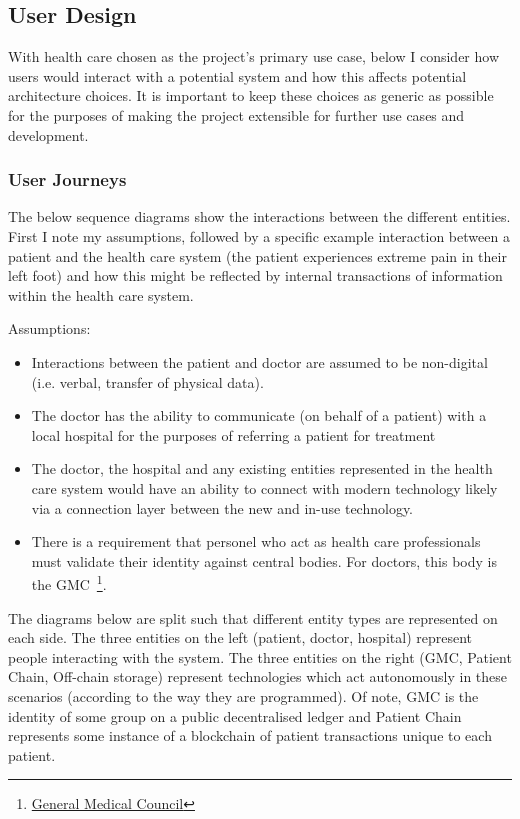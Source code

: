 \subsection{User Design}

With health care chosen as the project's primary use case, below I consider how users would interact with a potential system and how this affects potential architecture choices. It is important to keep these choices as generic as possible for the purposes of making the project extensible for further use cases and development.

\subsubsection{User Journeys}

The below sequence diagrams show the interactions between the different entities. First I note my assumptions, followed by a specific example interaction between a patient and the health care system (the patient experiences extreme pain in their left foot) and how this might be reflected by internal transactions of information within the health care system.

Assumptions:

\begin{itemize}
  \item Interactions between the patient and doctor are assumed to be non-digital (i.e. verbal, transfer of physical data).
  \item The doctor has the ability to communicate (on behalf of a patient) with a local hospital for the purposes of referring a patient for treatment
  \item The doctor, the hospital and any existing entities represented in the health care system would have an ability to connect with modern technology likely via a connection layer between the new and in-use technology.
  \item There is a requirement that personel who act as health care professionals must validate their identity against central bodies. For doctors, this body is the GMC~\footnote{\href{http://www.gmc-uk.org/}{General Medical Council}}.
\end{itemize}

The diagrams below are split such that different entity types are represented on each side. The three entities on the left (patient, doctor, hospital) represent people interacting with the system. The three entities on the right (GMC, Patient Chain, Off-chain storage) represent technologies which act autonomously in these scenarios (according to the way they are programmed). Of note, GMC is the identity of some group on a public decentralised ledger and Patient Chain represents some instance of a blockchain of patient transactions unique to each patient.

